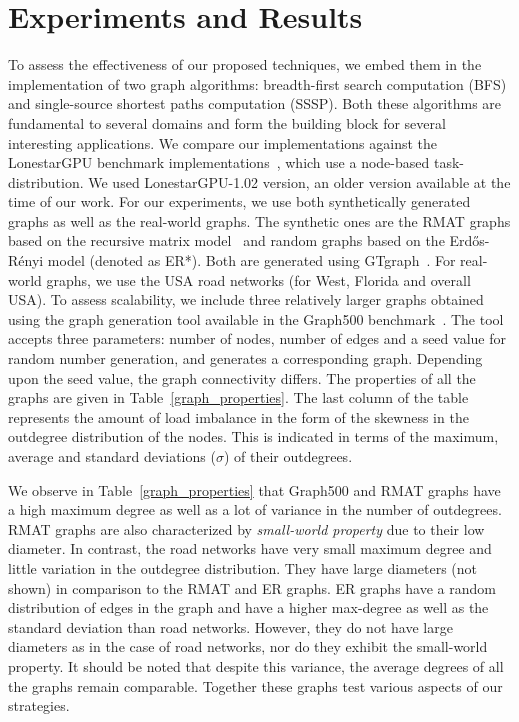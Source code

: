 \section{Experiments and Results}
\label{exp_res}

To assess the effectiveness of our proposed techniques, we embed them in the implementation of two graph algorithms: breadth-first search computation (BFS) and single-source shortest paths computation (SSSP).
Both these algorithms are fundamental to several domains and form the building block for several interesting applications.
We compare our implementations against the LonestarGPU benchmark implementations~\cite{lonestargpu-web},
which use a node-based task-distribution.
We used LonestarGPU-1.02 version, an older version available at the time of our work. 
For our experiments, we use both synthetically generated graphs as well as the real-world graphs.
The synthetic ones are the RMAT graphs based on the recursive matrix model~\cite{gtgraph} and random graphs based on the Erd\H{o}s-R\'enyi model (denoted as ER*). 
Both are generated using GTgraph~\cite{gtgraph}.
For real-world graphs, we use the USA road networks (for West, Florida and overall USA).
To assess scalability, we include three relatively larger graphs obtained using the graph generation tool available in the Graph500 benchmark~\cite{graph500-web}. 
The tool accepts three parameters: number of nodes, number of edges and a seed value for random number generation, and generates a corresponding graph.
Depending upon the seed value, the graph connectivity differs.
The properties of all the graphs are given in Table~\ref{graph_properties}. 
The last column of the table represents the amount of load imbalance in the form of the skewness in the outdegree distribution of the nodes.
This is indicated in terms of the maximum, average and standard deviations ($\sigma$) of their outdegrees.

We observe in Table~\ref{graph_properties} that Graph500 and RMAT graphs have a high maximum degree as well as a lot of variance in the number of outdegrees.
RMAT graphs are also characterized by \textit{small-world property} due to their low diameter.
In contrast, the road networks have very small maximum degree and little variation in the outdegree distribution. 
They have large diameters (not shown) in comparison to the RMAT and ER graphs.
ER graphs have a random distribution of edges in the graph and have a higher max-degree as well as the standard deviation than road networks.
However, they do not have large diameters as in the case of road networks, nor do they exhibit the small-world property.
It should be noted that despite this variance, the average degrees of all the graphs remain comparable.
Together these graphs test various aspects of our strategies.

